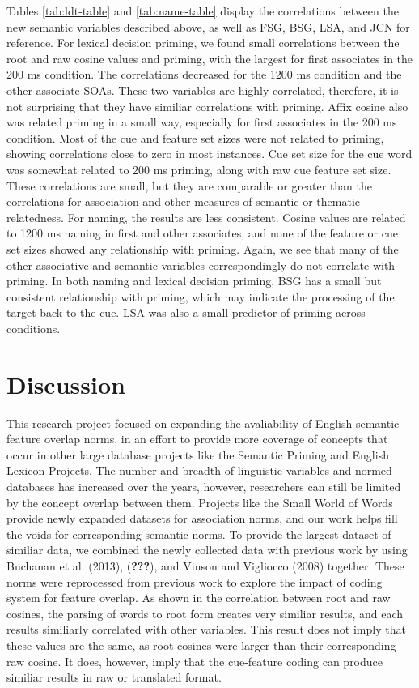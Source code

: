 \documentclass[english,man]{apa6}
\theoremstyle{definition}
\theoremstyle{definition}
\theoremstyle{definition}
\theoremstyle{remark}
\begin{document}
Tables \ref{tab:ldt-table} and \ref{tab:name-table} display the
correlations between the new semantic variables described above, as well
as FSG, BSG, LSA, and JCN for reference. For lexical decision priming,
we found small correlations between the root and raw cosine values and
priming, with the largest for first associates in the 200 ms condition.
The correlations decreased for the 1200 ms condition and the other
associate SOAs. These two variables are highly correlated, therefore, it
is not surprising that they have similiar correlations with priming.
Affix cosine also was related priming in a small way, especially for
first associates in the 200 ms condition. Most of the cue and feature
set sizes were not related to priming, showing correlations close to
zero in most instances. Cue set size for the cue word was somewhat
related to 200 ms priming, along with raw cue feature set size. These
correlations are small, but they are comparable or greater than the
correlations for association and other measures of semantic or thematic
relatedness. For naming, the results are less consistent. Cosine values
are related to 1200 ms naming in first and other associates, and none of
the feature or cue set sizes showed any relationship with priming.
Again, we see that many of the other associative and semantic variables
correspondingly do not correlate with priming. In both naming and
lexical decision priming, BSG has a small but consistent relationship
with priming, which may indicate the processing of the target back to
the cue. LSA was also a small predictor of priming across conditions.

\section{Discussion}\label{discussion}

This research project focused on expanding the avaliability of English
semantic feature overlap norms, in an effort to provide more coverage of
concepts that occur in other large database projects like the Semantic
Priming and English Lexicon Projects. The number and breadth of
linguistic variables and normed databases has increased over the years,
however, researchers can still be limited by the concept overlap between
them. Projects like the Small World of Words provide newly expanded
datasets for association norms, and our work helps fill the voids for
corresponding semantic norms. To provide the largest dataset of similiar
data, we combined the newly collected data with previous work by using
Buchanan et al. (2013), ({\textbf{???}}), and Vinson and Vigliocco
(2008) together. These norms were reprocessed from previous work to
explore the impact of coding system for feature overlap. As shown in the
correlation between root and raw cosines, the parsing of words to root
form creates very similiar results, and each results similiarly
correlated with other variables. This result does not imply that these
values are the same, as root cosines were larger than their
corresponding raw cosine. It does, however, imply that the cue-feature
coding can produce similiar results in raw or translated format.
\end{document}
